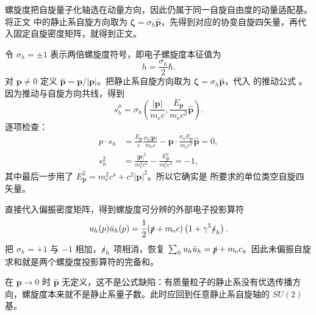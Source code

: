 \begin{derivation}

螺旋度把自旋量子化轴选在动量方向，因此仍属于同一自旋自由度的动量适配基。将正文 中的静止系自旋方向取为 $\boldsymbol\zeta=\sigma_h\widehat{\mathbf p}$，先得到对应的协变自旋四矢量，再代入固定自旋密度矩阵，就得到正文。



令 $\sigma_h=\pm1$ 表示两倍螺旋度符号，即电子螺旋度本征值为
\begin{equation*}
 h=\frac{\sigma_h}{2}\hbar.
\end{equation*}
对 $\mathbf p\neq0$ 定义 $\widehat{\mathbf p}=\mathbf p/|\mathbf p|$。把静止系自旋方向取为 $\boldsymbol\zeta=\sigma_h\widehat{\mathbf p}$，代入 的推动公式 。因为推动与自旋方向共线，得到
\begin{equation*}
 {
 s_h^\mu
 =\sigma_h\left(
 \frac{|\mathbf p|}{m_{\mathrm e} c},
 \frac{E_{\mathbf p}}{m_{\mathrm e} c^2}\widehat{\mathbf p}
 \right).}
 \end{equation*}
逐项检查：
\begin{align*}
 p\!\cdot s_h
 &=\frac{E_{\mathbf p}}{c}\frac{\sigma_h|\mathbf p|}{m_{\mathrm e} c}
 -\mathbf p\cdot
 \frac{\sigma_hE_{\mathbf p}}{m_{\mathrm e} c^2}\widehat{\mathbf p}
 =0,\\
 s_h^2
 &=\frac{|\mathbf p|^2}{m_{\mathrm e}^2c^2}
 -\frac{E_{\mathbf p}^2}{m_{\mathrm e}^2c^4}
 =-1,
\end{align*}
其中最后一步用了 $E_{\mathbf p}^2=m_{\mathrm e}^2c^4+c^2|\mathbf p|^2$。所以它确实是  所要求的单位类空自旋四矢量。

直接代入偏振密度矩阵，得到螺旋度可分辨的外部电子投影算符
\begin{equation*}
 {
 u_h(p)\bar u_h(p)
 =\frac12(\slashed p+m_{\mathrm e} c)
 \left(1+\gamma^5\slashed s_h\right).}
 \end{equation*}
把 $\sigma_h=+1$ 与 $-1$ 相加，$\slashed s_h$ 项相消，恢复
$\sum_hu_h\bar u_h=\slashed p+m_{\mathrm e} c$。因此未偏振自旋求和就是两个螺旋度投影算符的完备和。

在 $\mathbf p\to0$ 时 $\widehat{\mathbf p}$ 无定义，这不是公式缺陷：有质量粒子的静止系没有优选传播方向，螺旋度本来就不是静止系量子数。此时应回到任意静止系自旋轴的 $SU(2)$ 基。
\end{derivation}

